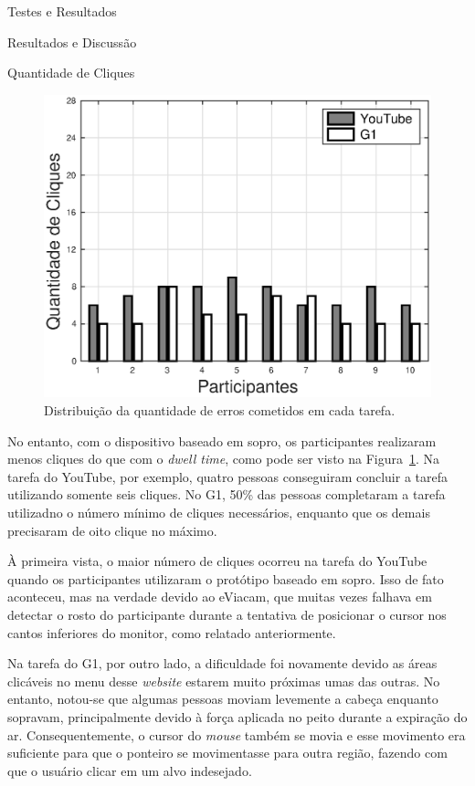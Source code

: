 \begin{chapter}{Testes e Resultados}
\begin{section}{Resultados e Discussão}
\begin{subsection}{Quantidade de Cliques}
\begin{figure}[!h]
	\centering
	\includegraphics[width=1.00\linewidth]{fig/PuffClicks}
	\caption{Distribuição da quantidade de erros cometidos em cada tarefa.}
	\label{fig:puffclicks}
\end{figure}

No entanto, com o dispositivo baseado em sopro, os participantes realizaram
menos cliques do que com o \textit{dwell time}, como pode ser visto na
Figura~\ref{fig:puffclicks}. Na tarefa do YouTube, por exemplo, quatro pessoas
conseguiram concluir a tarefa utilizando somente seis cliques. No G1, 50\% das
pessoas completaram a tarefa utilizadno o número mínimo de cliques necessários,
enquanto que os demais precisaram de oito clique no máximo.

À primeira vista, o maior número de cliques ocorreu na tarefa do YouTube quando
os participantes utilizaram o protótipo baseado em sopro. Isso de fato
aconteceu, mas na verdade devido ao eViacam, que muitas vezes falhava em
detectar o rosto do participante durante a tentativa de posicionar o cursor nos
cantos inferiores do monitor, como relatado anteriormente.

Na tarefa do G1, por outro lado, a dificuldade foi novamente devido as áreas
clicáveis no menu desse \textit{website} estarem muito próximas umas das
outras. No entanto, notou-se que algumas pessoas moviam levemente a cabeça
enquanto sopravam, principalmente devido à força aplicada no peito durante a
expiração do ar. Consequentemente, o cursor do \textit{mouse} também se movia e
esse movimento era suficiente para que o ponteiro se movimentasse para outra
região, fazendo com que o usuário clicar em um alvo indesejado.
\end{subsection}


\end{section}
\end{chapter}
